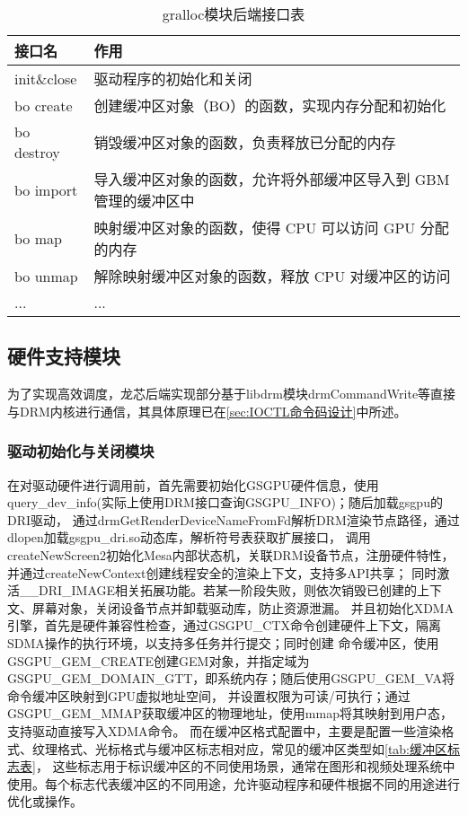 \begin{table}[h]  
  \centering
  \caption{gralloc模块后端接口表}
  \label{tab:gralloc模块后端接口表}
  \begin{tabular}{ll}
    \toprule
    接口名  & 作用\\
    \midrule
    init\&close & 驱动程序的初始化和关闭 \\
    bo create & 创建缓冲区对象（BO）的函数，实现内存分配和初始化 \\
    bo destroy & 销毁缓冲区对象的函数，负责释放已分配的内存 \\
    bo import & 导入缓冲区对象的函数，允许将外部缓冲区导入到 GBM 管理的缓冲区中 \\
    bo map & 映射缓冲区对象的函数，使得 CPU 可以访问 GPU 分配的内存 \\
    bo unmap & 解除映射缓冲区对象的函数，释放 CPU 对缓冲区的访问 \\
    ... & ... \\
    \bottomrule
  \end{tabular}
  \note{}
\end{table}

\subsection{硬件支持模块}

为了实现高效调度，龙芯后端实现部分基于libdrm模块drmCommandWrite等直接与DRM内核进行通信，其具体原理已在\ref{sec:IOCTL命令码设计}中所述。

\subsubsection{驱动初始化与关闭模块}

在对驱动硬件进行调用前，首先需要初始化GSGPU硬件信息，使用query\_dev\_info(实际上使用DRM接口查询GSGPU\_INFO)；随后加载gsgpu的DRI驱动，
通过drmGetRenderDeviceNameFromFd解析DRM渲染节点路径，通过dlopen加载gsgpu\_dri.so动态库，解析符号表获取扩展接口，
调用createNewScreen2初始化Mesa内部状态机，关联DRM设备节点，注册硬件特性，并通过createNewContext创建线程安全的渲染上下文，支持多API共享；
同时激活\_\_DRI\_IMAGE相关拓展功能。若某一阶段失败，则依次销毁已创建的上下文、屏幕对象，关闭设备节点并卸载驱动库，防止资源泄漏。
并且初始化XDMA引擎，首先是硬件兼容性检查，通过GSGPU\_CTX命令创建硬件上下文，隔离SDMA操作的执行环境，以支持多任务并行提交；同时创建
命令缓冲区，使用GSGPU\_GEM\_CREATE创建GEM对象，并指定域为GSGPU\_GEM\_DOMAIN\_GTT，即系统内存；随后使用GSGPU\_GEM\_VA将命令缓冲区映射到GPU虚拟地址空间，
并设置权限为可读/可执行；通过GSGPU\_GEM\_MMAP获取缓冲区的物理地址，使用mmap将其映射到用户态，支持驱动直接写入XDMA命令。
而在缓冲区格式配置中，主要是配置一些渲染格式、纹理格式、光标格式与缓冲区标志相对应，常见的缓冲区类型如\ref{tab:缓冲区标志表}，
这些标志用于标识缓冲区的不同使用场景，通常在图形和视频处理系统中使用。每个标志代表缓冲区的不同用途，允许驱动程序和硬件根据不同的用途进行优化或操作。


